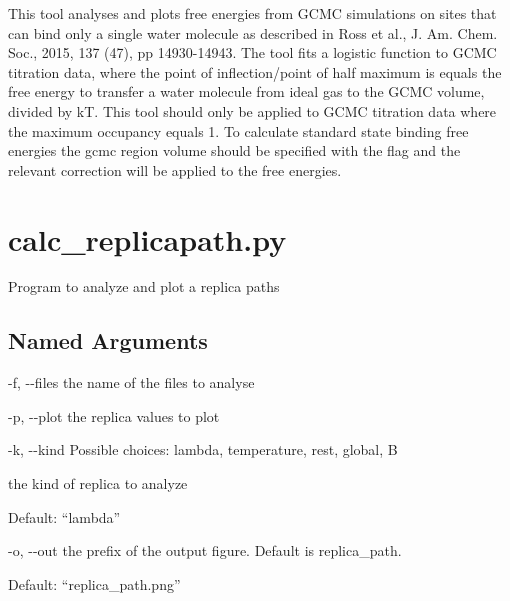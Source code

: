 \documentclass[letterpaper,10pt,english]{sphinxmanual}
\begin{document}

This tool analyses and plots free energies from GCMC simulations on sites that can bind only a single water molecule as described in Ross et al., J. Am. Chem. Soc., 2015, 137 (47), pp 14930-14943. The tool fits a logistic function to GCMC titration data, where the point of inflection/point of half maximum is equals the free energy to transfer a water molecule from ideal gas to the GCMC volume, divided by kT. This tool should only be applied to GCMC titration data where the maximum occupancy equals 1. To calculate standard state binding free energies the gcmc region volume should be specified with the  flag and the relevant correction will be applied to the free energies.


\section{calc\_replicapath.py}
\label{\detokenize{tools:calc-replicapath-py}}

Program to analyze and plot a replica paths


%
\begin{sphinxVerbatim}[commandchars=\\\{\}]
  \PYG{p}{[}\PYG{p}{]} \PYG{p}{[}  \PYG{p}{[} \PYG{p}{]}\PYG{p}{]} \PYG{p}{[}  \PYG{p}{[} \PYG{p}{]}\PYG{p}{]}
                           \PYG{p}{[} \PYG{p}{]} \PYG{p}{[} \PYG{p}{]}
\end{sphinxVerbatim}


\subsection{Named Arguments}
\label{\detokenize{tools:Named Arguments}}\begin{optionlist}{3cm}
\item [-f, -{-}files]  
the name of the files to analyse
\item [-p, -{-}plot]  
the replica values to plot
\item [-k, -{-}kind]  
Possible choices: lambda, temperature, rest, global, B

the kind of replica to analyze

Default: “lambda”
\item [-o, -{-}out]  
the prefix of the output figure. Default is replica\_path.

Default: “replica\_path.png”
\end{optionlist}
\end{document}
